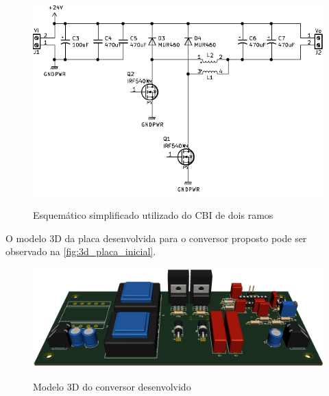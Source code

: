     \begin{figure}[H]
    	\centering
    	\caption{Esquemático simplificado utilizado do CBI de dois ramos}
    	\includegraphics[scale=1.2]{pdf/layout/Esquematico_CBI_simples.pdf}
        \label{fig:esquematico_cbi_1}
    \end{figure}
    
    O modelo 3D da placa desenvolvida para o conversor proposto pode ser observado na \autoref{fig:3d_placa_inicial}.
    
    \begin{figure}[H]
    	\centering
    	\caption{Modelo 3D do conversor desenvolvido}
    	\includegraphics[scale=.35]{pdf/fotos/placa_inicial.png}
        \label{fig:3d_placa_inicial}
    \end{figure}
    
    
    
    
